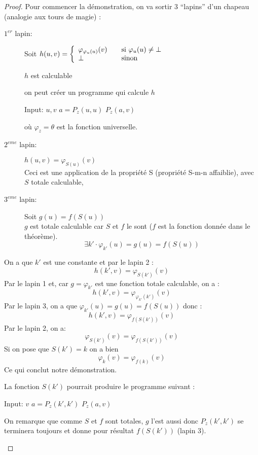 \begin{proof}
Pour commencer la démonstration, on va sortir 3 ``lapins'' d'un chapeau (analogie aux tours de magie) :
\begin{description}

	\item[$1^{er}$ lapin:] Soit $ h(u,v) = \left\{
	\begin{array}{l l}
		\varphi_{\varphi_{u}(u)}(v) & \quad \text{si }\varphi_u(u)\neq \bot\\
    	\bot & \quad \text{sinon}
	\end{array} \right.$

		$h$ est calculable
		\begin{myrem}
			on peut créer un programme qui calcule $h$
            \begin{algorithmic}
              \STATE Input: $u,v$
              \STATE $a = P_z(u,u)$
              \STATE $P_z(a,v)$
            \end{algorithmic}
            où $\varphi_z = \theta$ est la fonction universelle.
		\end{myrem}

	\item[$2^{eme}$ lapin:] $h(u,v)=\varphi_{S(u)}(v)$\\
	Ceci est une application de la propriété S (propriété S-m-n affaiblie), avec $S$ totale calculable, 

	\item[$3^{eme}$ lapin:] Soit $g(u)=f(S(u))$\\
	 $g$ est totale calculable car $S$ et $f$ le sont ($f$
		est la fonction donnée dans le théorème).
		\[ \exists k' \cdot \varphi_{k'}(u) =g(u)=f(S(u)) \]
\end{description}
On a que $k'$ est une constante et par le lapin 2 :
\[h(k',v) = \varphi_{S(k')}(v)\]
Par le lapin 1 et, car $g=\varphi_{k'}$ est une fonction totale calculable, on a :
\[h(k',v) = \varphi_{\varphi_{k'}(k')}(v)\]
Par le lapin 3, on a que $\varphi_{k'}(u) = g(u)=f(S(u))$ donc :
\[h(k',v) = \varphi_{f(S(k'))}(v)\]
Par le lapin 2, on a:
\[ \varphi_{S(k')}(v) =\varphi_{f(S(k'))}(v) \]
Si on pose que $S(k')=k$ on a bien
\[ \varphi_{k}(v) = \varphi_{f(k)}(v) \]
Ce qui conclut notre démonstration.
		\begin{myrem}
          La fonction $S(k')$ pourrait produire le programme suivant :
          \begin{algorithmic}
            \STATE Input: $v$
            \STATE $a = P_z(k',k')$
            \STATE $P_z(a,v)$
          \end{algorithmic}
          On remarque que comme $S$ et $f$ sont totales,
          $g$ l'est aussi donc $P_z(k',k')$ se terminera toujours et donne pour résultat $f(S(k'))$ (lapin 3).


\end{myrem}
\end{proof}
